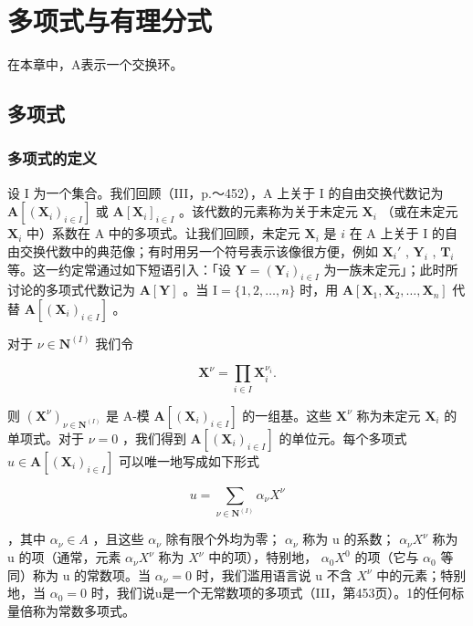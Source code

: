 \chapter{多项式与有理分式}

在本章中，A表示一个交换环。

\section{多项式}

\subsection{多项式的定义}

设 I 为一个集合。我们回顾（III，p.～452），A 上关于 I 的自由交换代数记为 \(\mathbf{A}[(\mathbf{X}_i)_{i\in I}]\) 或 \(\mathbf{A}[\mathbf{X}_i]_{i\in I}\) 。该代数的元素称为关于未定元 \(\mathbf{X}_i\) （或在未定元 \(\mathbf{X}_i\) 中）系数在 A 中的多项式。让我们回顾，未定元 \(\mathbf{X}_i\) 是 \(i\) 在 A 上关于 I 的自由交换代数中的典范像；有时用另一个符号表示该像很方便，例如 \(\mathbf{X}_i'\) , \(\mathbf{Y}_i\) , \(\mathbf{T}_i\) 等。这一约定常通过如下短语引入：「设 \(\mathbf{Y} = (\mathbf{Y}_i)_{i\in I}\) 为一族未定元」；此时所讨论的多项式代数记为 \(\mathbf{A}[\mathbf{Y}]\) 。当 \(\mathrm{I} = \{1,2,\dots,n\}\) 时，用 \(\mathbf{A}[\mathbf{X}_1,\mathbf{X}_2,\dots,\mathbf{X}_n]\) 代替 \(\mathbf{A}[(\mathbf{X}_i)_{i\in I}]\) 。

对于 \(\nu \in \mathbf{N}^{(I)}\) 我们令

\[
\mathbf {X} ^ {\nu} = \prod_ {i \in I} \mathbf {X} _ {i} ^ {\nu_ {i}}.
\]

则 \((\mathbf{X}^{\nu})_{\nu \in \mathbf{N}^{(I)}}\) 是 A-模 \(\mathbf{A}[(\mathbf{X}_i)_{i\in I}]\) 的一组基。这些 \(\mathbf{X}^{\nu}\) 称为未定元 \(\mathbf{X}_i\) 的单项式。对于 \(\nu = 0\) ，我们得到 \(\mathbf{A}[(\mathbf{X}_i)_{i\in I}]\) 的单位元。每个多项式 \(u\in \mathbf{A}[(\mathbf{X}_i)_{i\in I}]\) 可以唯一地写成如下形式

\[
u = \sum_ {\nu \in \mathbf {N} ^ {(I)}} \alpha_ {\nu} X ^ {\nu}
\]

，其中 \(\alpha_{\nu}\in A\) ，且这些 \(\alpha_{\nu}\) 除有限个外均为零； \(\alpha_{\nu}\) 称为 u 的系数； \(\alpha_{\nu}X^{\nu}\) 称为 u 的项（通常，元素 \(\alpha_{\nu}X^{\nu}\) 称为 \(X^{\nu}\) 中的项），特别地， \(\alpha_{0}X^{0}\) 的项（它与 \(\alpha_{0}\) 等同）称为 u 的常数项。当 \(\alpha_{\nu}=0\) 时，我们滥用语言说 u 不含 \(X^{\nu}\) 中的元素；特别地，当 \(\alpha_{0}=0\) 时，我们说u是一个无常数项的多项式（III，第453页）。1的任何标量倍称为常数多项式。

